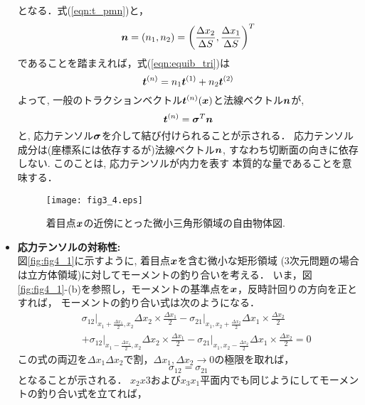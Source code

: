 \documentclass[10pt,a4j]{jbook}
\begin{document}
\begin{itemize}
	となる．式(\ref{eqn:t_pmn})と，
	\begin{equation}
		\mbox{\boldmath $n$}= \left(n_1,n_2\right)=\left( \frac{\Delta x_2}{\Delta S}, \frac{\Delta x_1}{\Delta S}\right)^T
	\end{equation}
	であることを踏まえれば，式(\ref{eqn:equib_tri})は
	\begin{equation}
		\mbox{\boldmath $t$}^{(n)}=n_1\mbox{\boldmath $t$}^{(1)}+n_2\mbox{\boldmath $t$}^{(2)} 
	\end{equation}
	よって, 一般のトラクションベクトル$\mbox{\boldmath $t$}^{(n)}(\mbox{\boldmath $x$})$と法線ベクトル$\mbox{\boldmath $n$}$が, 
	\begin{equation}
		\mbox{\boldmath $t$}^{(n)}=\mbox{\boldmath $\sigma$}^{T}\mbox{\boldmath $n$}
		\label{eqn:t_as_sign}
	\end{equation}
	と, 応力テンソル$\mbox{\boldmath $\sigma$}$を介して結び付けられることが示される．
	応力テンソル成分は(座標系には依存するが)法線ベクトル$\mbox{\boldmath $n$}$, 
	すなわち切断面の向きに依存しない. このことは, 応力テンソルが内力を表す
	本質的な量であることを意味する．
	\begin{figure}[h]
		\begin{center}
		\texttt{[image: fig3\_4.eps]} 
		\end{center}
		\caption{着目点$\mbox{\boldmath $x$}$の近傍にとった微小三角形領域の自由物体図.}
		\label{fig:fig3_4}
									\end{figure}
\item
	{\bf 応力テンソルの対称性:}\\
	図\ref{fig:fig4_1}に示すように, 着目点$\mbox{\boldmath $x$}$を含む微小な矩形領域
	(3次元問題の場合は立方体領域)に対してモーメントの釣り合いを考える．
	いま，図\ref{fig:fig4_1}-(b)を参照し，モーメントの基準点を$\mbox{\boldmath $x$}$，反時計回りの方向を正とすれば，
	モーメントの釣り合い式は次のようになる．
	\begin{eqnarray}
		&& \left. \sigma_{12}\right|_{x_1+\frac{\Delta x_1}{2},x_2}\Delta x_2  \times \frac{\Delta x_1}{2} 
		-
		\left. \sigma_{21}\right|_{x_1,x_2+\frac{\Delta x_2}{2}}\Delta x_1  \times \frac{\Delta x_2}{2} \nonumber \\
		&&
		+
		\left. \sigma_{12}\right|_{x_1-\frac{\Delta x_1}{2},x_2}\Delta x_2  \times \frac{\Delta x_1}{2} 
		-
		\left. \sigma_{21}\right|_{x_1,x_2-\frac{\Delta x_2}{2}}\Delta x_1  \times \frac{\Delta x_2}{2}
		=0
	\end{eqnarray}
	この式の両辺を$\Delta x_1\Delta x_2$で割，$\Delta x_1, \Delta x_2\rightarrow 0$の極限を取れば，
	\begin{equation}
		\sigma_{12}=\sigma_{21}
	\end{equation}
	となることが示される．
	$x_2x3$および$x_3x_1$平面内でも同じようにしてモーメントの釣り合い式を立てれば，

\end{itemize}
\end{document}
